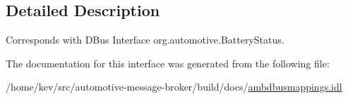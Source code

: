 \subsection{Detailed Description}
Corresponds with D\+Bus Interface org.\+automotive.\+Battery\+Status. 

The documentation for this interface was generated from the following file\+:\begin{DoxyCompactItemize}
\item 
/home/kev/src/automotive-\/message-\/broker/build/docs/\hyperlink{ambdbusmappings_8idl}{ambdbusmappings.\+idl}\end{DoxyCompactItemize}

